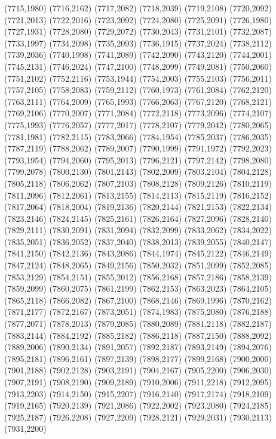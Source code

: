 (7715,1980)
(7716,2162)
(7717,2082)
(7718,2039)
(7719,2108)
(7720,2092)
(7721,2013)
(7722,2016)
(7723,2092)
(7724,2080)
(7725,2091)
(7726,1980)
(7727,1931)
(7728,2080)
(7729,2072)
(7730,2043)
(7731,2101)
(7732,2087)
(7733,1997)
(7734,2098)
(7735,2093)
(7736,1915)
(7737,2024)
(7738,2112)
(7739,2036)
(7740,1998)
(7741,2089)
(7742,2090)
(7743,2120)
(7744,2001)
(7745,2131)
(7746,2024)
(7747,2100)
(7748,2099)
(7749,2081)
(7750,2060)
(7751,2102)
(7752,2116)
(7753,1944)
(7754,2003)
(7755,2103)
(7756,2011)
(7757,2105)
(7758,2083)
(7759,2112)
(7760,1973)
(7761,2084)
(7762,2120)
(7763,2111)
(7764,2009)
(7765,1993)
(7766,2063)
(7767,2120)
(7768,2121)
(7769,2106)
(7770,2007)
(7771,2084)
(7772,2118)
(7773,2096)
(7774,2107)
(7775,1993)
(7776,2057)
(7777,2017)
(7778,2107)
(7779,2042)
(7780,2065)
(7781,1981)
(7782,2115)
(7783,2066)
(7784,1954)
(7785,2037)
(7786,2035)
(7787,2119)
(7788,2062)
(7789,2007)
(7790,1999)
(7791,1972)
(7792,2023)
(7793,1954)
(7794,2060)
(7795,2013)
(7796,2121)
(7797,2142)
(7798,2080)
(7799,2078)
(7800,2130)
(7801,2143)
(7802,2009)
(7803,2104)
(7804,2128)
(7805,2118)
(7806,2062)
(7807,2103)
(7808,2128)
(7809,2126)
(7810,2119)
(7811,2096)
(7812,2061)
(7813,2155)
(7814,2113)
(7815,2119)
(7816,2152)
(7817,2064)
(7818,2004)
(7819,2136)
(7820,2144)
(7821,2153)
(7822,2134)
(7823,2146)
(7824,2145)
(7825,2161)
(7826,2164)
(7827,2096)
(7828,2140)
(7829,2111)
(7830,2091)
(7831,2094)
(7832,2099)
(7833,2062)
(7834,2022)
(7835,2051)
(7836,2052)
(7837,2040)
(7838,2013)
(7839,2055)
(7840,2147)
(7841,2150)
(7842,2136)
(7843,2086)
(7844,1974)
(7845,2122)
(7846,2149)
(7847,2124)
(7848,2065)
(7849,2156)
(7850,2032)
(7851,2099)
(7852,2085)
(7853,2129)
(7854,2151)
(7855,2012)
(7856,2168)
(7857,2186)
(7858,2139)
(7859,2099)
(7860,2075)
(7861,2199)
(7862,2153)
(7863,2023)
(7864,2105)
(7865,2118)
(7866,2082)
(7867,2100)
(7868,2146)
(7869,1996)
(7870,2162)
(7871,2177)
(7872,2167)
(7873,2051)
(7874,1983)
(7875,2080)
(7876,2188)
(7877,2071)
(7878,2013)
(7879,2085)
(7880,2089)
(7881,2118)
(7882,2187)
(7883,2144)
(7884,2192)
(7885,2182)
(7886,2118)
(7887,2150)
(7888,2092)
(7889,2006)
(7890,2134)
(7891,2057)
(7892,2187)
(7893,2149)
(7894,2076)
(7895,2181)
(7896,2161)
(7897,2139)
(7898,2177)
(7899,2168)
(7900,2000)
(7901,2188)
(7902,2128)
(7903,2191)
(7904,2167)
(7905,2200)
(7906,2030)
(7907,2191)
(7908,2190)
(7909,2189)
(7910,2006)
(7911,2218)
(7912,2095)
(7913,2203)
(7914,2150)
(7915,2207)
(7916,2140)
(7917,2174)
(7918,2109)
(7919,2165)
(7920,2139)
(7921,2086)
(7922,2002)
(7923,2080)
(7924,2185)
(7925,2187)
(7926,2208)
(7927,2209)
(7928,2121)
(7929,2031)
(7930,2113)
(7931,2200)
